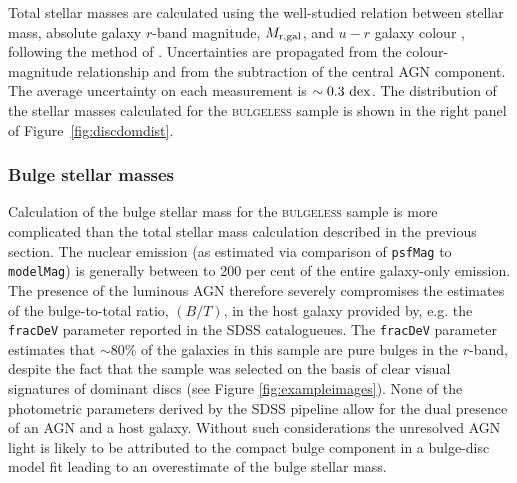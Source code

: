 {Total stellar masses are calculated using the well-studied relation between stellar mass, absolute galaxy $r$-band magnitude, $M_{\rm{r, gal}}$, and $u-r$ galaxy colour \citep[corrected for galactic extinction;][using the galaxy magnitudes described in Section~\ref{sec:photo}]{schlegel98}, following the method of \citet[][see Section \ref{sec:defsample}]{Baldry06}. Uncertainties are propagated from the colour-magnitude relationship and from the subtraction of the central AGN component. The average uncertainty on each measurement is $\sim0.3~\rm{dex}$. The distribution of the stellar masses calculated for the \textsc{bulgeless} sample is shown in the right panel of Figure~\ref{fig:discdomdist}. 

\subsubsection{Bulge stellar masses}\label{sec:bulgemass}

Calculation of the bulge stellar mass for the \textsc{bulgeless} sample is more complicated than the total stellar mass calculation described in the previous section. The nuclear emission (as estimated via comparison of {\tt psfMag} to {\tt modelMag}) is generally between { to 200 per cent} of the entire galaxy-only emission. The presence of the luminous AGN therefore severely compromises the estimates of the bulge-to-total ratio, $(B/T)$, in the host galaxy provided by, e.g. the {\tt fracDeV} parameter reported in the SDSS catalogueues. The {\tt fracDeV} parameter estimates that $\sim 80\%$ of the galaxies in this sample are pure \citet{devaucouleurs} bulges in the $r$-band, despite the fact that the sample was selected on the basis of clear visual signatures of dominant discs (see Figure \ref{fig:exampleimages}). None of the photometric parameters derived by the SDSS pipeline allow for the dual presence of an AGN and a host galaxy. Without such considerations the unresolved AGN light is likely to be attributed to the compact bulge component in a bulge-disc model fit \citep{simmons08,koss11} leading to an overestimate of the bulge stellar mass.


}
